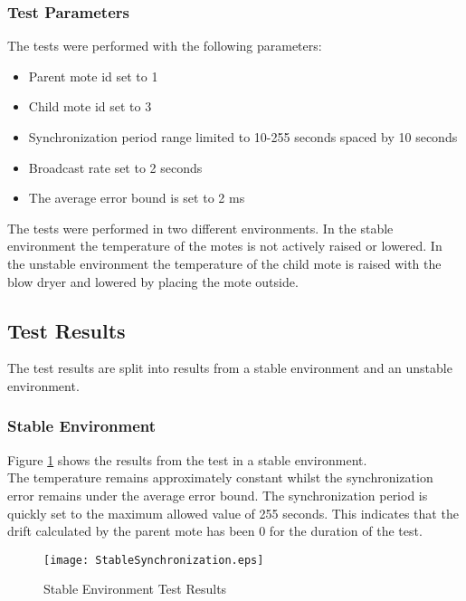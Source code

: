 \documentclass[Main]{subfiles}
\begin{document}
		\subsubsection{Test Parameters} %
		\label{subsub:test_parameters}
			The tests were performed with the following parameters:

			\begin{itemize}
				\item Parent mote id set to 1
				\item Child mote id set to 3
				\item Synchronization period range limited to 10-255 seconds spaced by 10 seconds
				\item Broadcast rate set to 2 seconds
				\item The average error bound is set to 2 ms
			\end{itemize}

			The tests were performed in two different environments.
			In the stable environment the temperature of the motes is not actively raised or lowered.
			In the unstable environment the temperature of the child mote is raised with the blow dryer and lowered by placing the mote outside.
		
	

	\subsection{Test Results} %
	\label{sub:test_results}
		The test results are split into results from a stable environment and an unstable environment.  


		\subsubsection{Stable Environment} %
		\label{sub:stable_environment}
			
			
			Figure \ref{fig:stableSynchronization} shows the results from the test in a stable environment.
			\\The temperature remains approximately constant whilst the synchronization error remains under the average error bound.
			The synchronization period is quickly set to the maximum allowed value of 255 seconds. This indicates that the drift calculated by the parent mote has been 0 for the duration of the test.   

			\begin{figure}[H]
				\centering
				\texttt{[image: StableSynchronization.eps]}
				\caption{Stable Environment Test Results}
				\label{fig:stableSynchronization}
			\end{figure}
\end{document}
